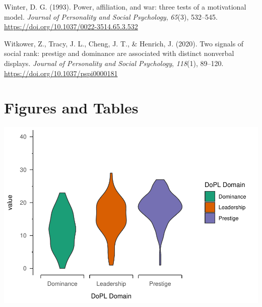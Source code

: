 \documentclass[
  english,
  a4paper,floatsintext]{apa7}
\newlength{\cslhangindent}
\newlength{\cslentryspacingunit} %
\newenvironment{CSLReferences}[2] %
 {%
  \setlength{\parindent}{0pt}
  \ifodd #1
  \let\oldpar\par
  \def\par{\hangindent=\cslhangindent\oldpar}
  \fi
  \setlength{\parskip}{#2\cslentryspacingunit}
 }%
 {}
\begin{document}
\begin{CSLReferences}{1}{0}
\leavevmode{}%
Winter, D. G. (1993). Power, affiliation, and war: three tests of a motivational model. \emph{Journal of Personality and Social Psychology}, \emph{65}(3), 532--545. \url{https://doi.org/10.1037/0022-3514.65.3.532}

\leavevmode{}%
Witkower, Z., Tracy, J. L., Cheng, J. T., \& Henrich, J. (2020). Two signals of social rank: prestige and dominance are associated with distinct nonverbal displays. \emph{Journal of Personality and Social Psychology}, \emph{118}(1), 89--120. \url{https://doi.org/10.1037/pspi0000181}

\end{CSLReferences}

\endgroup

\newpage

\hypertarget{figures-and-tables}{%
\section{Figures and Tables}\label{figures-and-tables}}

\includegraphics{DoPL-Experiment_files/figure-latex/unnamed-chunk-2-1.pdf}
\end{document}
